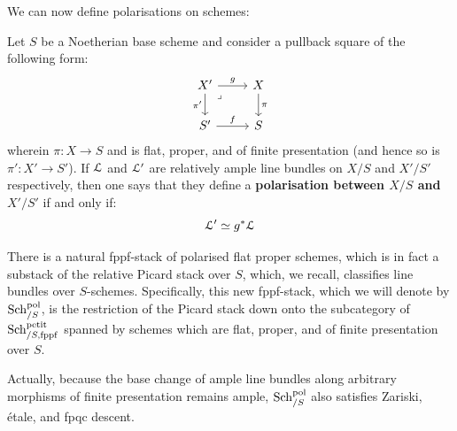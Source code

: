                     We can now define polarisations on schemes:
                    \begin{definition}[Polarisations] \label{def: polarisations}
                        Let $S$ be a Noetherian base scheme and consider a pullback square of the following form:
                            $$
                                \begin{tikzcd}
                                	{X'} & X \\
                                	{S'} & S
                                	\arrow["g", from=1-1, to=1-2]
                                	\arrow["{\pi'}"', from=1-1, to=2-1]
                                	\arrow["\pi", from=1-2, to=2-2]
                                	\arrow["f", from=2-1, to=2-2]
                                	\arrow["\lrcorner"{anchor=center, pos=0.125}, draw=none, from=1-1, to=2-2]
                                \end{tikzcd}
                            $$
                        wherein $\pi: X \to S$ and is flat, proper, and of finite presentation (and hence so is $\pi': X' \to S'$). If $\mathcal{L}$ and $\mathcal{L}'$ are relatively ample line bundles on $X/S$ and $X'/S'$ respectively, then one says that they define a \textbf{polarisation between $X/S$ and $X'/S'$} if and only if:
                            $$\mathcal{L}' \simeq g^*\mathcal{L}$$
                    \end{definition}
                    \begin{remark} \label{remark: moduli_stacks_of_polarisations}
                        There is a natural fppf-stack of polarised flat proper schemes, which is in fact a substack of the relative Picard stack over $S$, which, we recall, classifies line bundles over $S$-schemes. Specifically, this new fppf-stack, which we will denote by $\mathrm{Sch}_{/S}^{\mathrm{pol}}$, is the restriction of the Picard stack down onto the subcategory of $\mathrm{Sch}_{/S, \mathrm{fppf}}^{\mathrm{petit}}$ spanned by schemes which are flat, proper, and of finite presentation over $S$.
                        
                        Actually, because the base change of ample line bundles along arbitrary morphisms of finite presentation remains ample, $\mathrm{Sch}_{/S}^{\mathrm{pol}}$ also satisfies Zariski, \'etale, and fpqc descent.
                    \end{remark}

